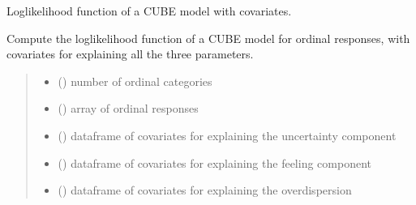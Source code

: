 \documentclass[letterpaper,10pt,english]{sphinxmanual}
\begin{document}
\begin{fulllineitems}
\label{\detokenize{cubmods:cubmods.cube_ywz.loglik}}
\pysigstartsignatures
{}
\pysigstopsignatures
\sphinxAtStartPar
Log\sphinxhyphen{}likelihood function of a CUBE model with covariates.

\sphinxAtStartPar
Compute the log\sphinxhyphen{}likelihood function of a CUBE model for ordinal responses,
with covariates for explaining all the three parameters.
\begin{quote}\begin{description}
\begin{itemize}
\item {} 
\sphinxAtStartPar
{} () \textendash{} number of ordinal categories

\item {} 
\sphinxAtStartPar
{} () \textendash{} array of ordinal responses

\item {} 
\sphinxAtStartPar
{} () \textendash{} dataframe of covariates for explaining the uncertainty component

\item {} 
\sphinxAtStartPar
{} () \textendash{} dataframe of covariates for explaining the feeling component

\item {} 
\sphinxAtStartPar
{} () \textendash{} dataframe of covariates for explaining the overdispersion


\end{itemize}
\end{description}
\end{quote}
\end{fulllineitems}
\end{document}
